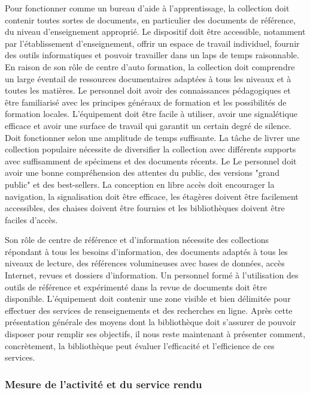 \documentclass[french,a4paper,12pt]{article}
\begin{document}
\quad Pour fonctionner comme un bureau d'aide à l'apprentissage, la collection doit contenir toutes sortes de documents, en particulier des documents de référence, du niveau d'enseignement approprié. Le dispositif doit être accessible, notamment par l'établissement d'enseignement, offrir un espace de travail individuel, fournir des outils informatiques et pouvoir travailler dans un laps de temps raisonnable. 
En raison de son rôle de centre d'auto formation, la collection doit comprendre un large éventail de ressources documentaires adaptées à tous les niveaux et à toutes les matières. Le personnel doit avoir des connaissances pédagogiques et être familiarisé avec les principes généraux de formation et les possibilités de formation locales. L'équipement doit être facile à utiliser, avoir une signalétique efficace et avoir une surface de travail qui garantit un certain degré de silence. Doit fonctionner selon une amplitude de temps suffisante. La tâche de livrer une collection populaire nécessite de diversifier la collection avec différents supports avec suffisamment de spécimens et des documents récents. Le Le personnel doit avoir une bonne compréhension des attentes du public, des versions "grand public" et des best-sellers. La conception en libre accès doit encourager la navigation, la signalisation doit être efficace, les étagères doivent être facilement accessibles, des chaises doivent être fournies et les bibliothèques doivent être faciles d'accès. 


\quad Son rôle de centre de référence et d'information nécessite des collections répondant à tous les besoins d'information, des documents adaptés à tous les niveaux de lecture, des références volumineuses avec bases de données, accès Internet, revues et dossiers d'information. Un personnel formé à l'utilisation des outils de référence et expérimenté dans la revue de documents doit être disponible. L'équipement doit contenir une zone visible et bien délimitée pour effectuer des services de renseignements et des recherches en ligne. 
Après cette présentation générale des moyens dont la bibliothèque doit s’assurer de pouvoir disposer pour remplir ses objectifs, il nous reste maintenant à présenter comment, concrètement, la bibliothèque peut évaluer l’efficacité et l’efficience de ces services. 



\subsubsection{Mesure de l’activité et du service rendu}
\end{document}
